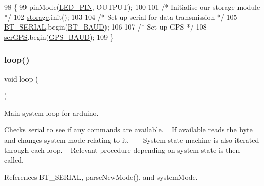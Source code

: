 \begin{DoxyCode}
98 \{
99   pinMode(\hyperlink{logging-device_8ino_ab4553be4db9860d940f81d7447173b2f}{LED\_PIN}, OUTPUT);
100 
101   \textcolor{comment}{/* Initialise our storage module */}
102   \hyperlink{logging-device_8ino_a40059244119c00baa1b841119cfd1b2e}{storage}.init();
103 
104   \textcolor{comment}{/* Set up serial for data transmission */}
105   \hyperlink{logging-device_8ino_ad1e6e6f6fc813b305067b9e1b0777ea6}{BT\_SERIAL}.begin(\hyperlink{logging-device_8ino_a6882992121626898bccaa43be51ba4c2}{BT\_BAUD});
106 
107   \textcolor{comment}{/* Set up GPS */}
108   \hyperlink{logging-device_8ino_aa2475f51bdc0f31d16d2916991d618d9}{serGPS}.begin(\hyperlink{logging-device_8ino_af0875ffe69dbe45df3f85c1f720c3eee}{GPS\_BAUD});
109 \}
\end{DoxyCode}
\mbox{\label{logging-device_8ino_afe461d27b9c48d5921c00d521181f12f}} 
\subsubsection{\texorpdfstring{loop()}{loop()}}
{\footnotesize\ttfamily void loop (\begin{DoxyParamCaption}{ }\end{DoxyParamCaption})}



Main system loop for arduino. 

Checks serial to see if any commands are available. ~\newline
If available reads the byte and changes system mode relating to it. ~\newline
~\newline
System state machine is also iterated through each loop. ~\newline
Relevant procedure depending on system state is then called. 

References B\+T\+\_\+\+S\+E\+R\+I\+AL, parse\+New\+Mode(), and system\+Mode.


